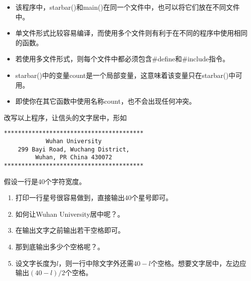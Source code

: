 \begin{frame}[fragile]
\begin{itemize}
\item
该程序中，{\tf starbar()}和{\tf main()}在同一个文件中，也可以将它们放在不同文件中。\\[0.1in]
\item 
单文件形式比较容易编译，而使用多个文件则有利于在不同的程序中使用相同的函数。\\[0.1in]
\item 
若使用多文件形式，则每个文件中都必须包含{\tf \#define}和{\tf \#include}指令。
\end{itemize}

\end{frame}

\begin{frame}[fragile]
\begin{itemize}
\item
{\tf starbar()}中的变量{\tf count}是一个局部变量，这意味着该变量只在{\tf starbar()}中可用。\\[0.1in]
\item 
即使你在其它函数中使用名称{\tf count}，也不会出现任何冲突。
\end{itemize}

\end{frame}

\begin{frame}[fragile]
改写以上程序，让信头的文字居中，形如
\begin{lstlisting}
****************************************
            Wuhan University
    299 Bayi Road, Wuchang District,
         Wuhan, PR China 430072
****************************************
\end{lstlisting}
\end{frame}

\begin{frame}[fragile]
假设一行是40个字符宽度。\vspace{0.1in} \pause 

\begin{enumerate}
\item
打印一行星号很容易做到，直接输出40个星号即可。\\[0.1in] \pause 
\item 
如何让Wuhan University居中呢？。
\\[0.1in] \pause 
\item[]
在输出文字之前输出若干空格即可。\\[0.1in] \pause 
\item 
那到底输出多少个空格呢？。
\\[0.1in] \pause 
\item[]
设文字长度为$l$，则一行中除文字外还需$40-l$个空格。想要文字居中，左边应输出$(40-l)/2$个空格。
\end{enumerate}

\end{frame}

